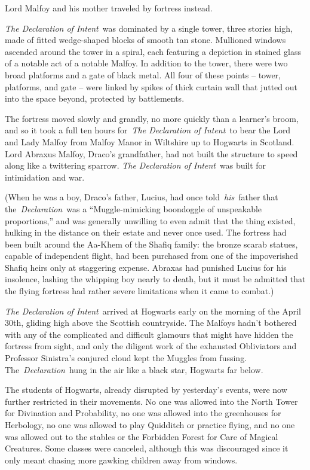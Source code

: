 Lord Malfoy and his mother traveled by fortress instead.

\emph{The Declaration of Intent}~was dominated by a single tower, three
stories high, made of fitted wedge-shaped blocks of smooth tan stone.
Mullioned windows ascended around the tower in a spiral, each featuring
a depiction in stained glass of a notable act of a notable Malfoy. In
addition to the tower, there were two broad platforms and a gate of
black metal. All four of these points -- tower, platforms, and gate --
were linked by spikes of thick curtain wall that jutted out into the
space beyond, protected by battlements.

The fortress moved slowly and grandly, no more quickly than a learner's
broom, and so it took a full ten hours for~\emph{The Declaration of
Intent}~to bear the Lord and Lady Malfoy from Malfoy Manor in Wiltshire
up to Hogwarts in Scotland. Lord Abraxus Malfoy, Draco's grandfather,
had not built the structure to speed along like a twittering sparrow.
\emph{The Declaration of Intent}~was built for intimidation and war.

(When he was a boy, Draco's father, Lucius, had once
told~\emph{his}~father that the~\emph{Declaration}~was a
``Muggle-mimicking boondoggle of unspeakable proportions,'' and was
generally unwilling to even admit that the thing existed, hulking in the
distance on their estate and never once used. The fortress had been
built around the Aa-Khem of the Shafiq family: the bronze scarab
statues, capable of independent flight, had been purchased from one of
the impoverished Shafiq heirs only at staggering expense. Abraxas had
punished Lucius for his insolence, lashing the whipping boy nearly to
death, but it must be admitted that the flying fortress had rather
severe limitations when it came to combat.)

\emph{The Declaration of Intent}~arrived at Hogwarts early on the
morning of the April 30th, gliding high above the Scottish countryside.
The Malfoys hadn't bothered with any of the complicated and difficult
glamours that might have hidden the fortress from sight, and only the
diligent work of the exhausted Obliviators and Professor Sinistra's
conjured cloud kept the Muggles from fussing.
The~\emph{Declaration}~hung in the air like a black star, Hogwarts far
below.

The students of Hogwarts, already disrupted by yesterday's events, were
now further restricted in their movements. No one was allowed into the
North Tower for Divination and Probability, no one was allowed into the
greenhouses for Herbology, no one was allowed to play Quidditch or
practice flying, and no one was allowed out to the stables or the
Forbidden Forest for Care of Magical Creatures. Some classes were
canceled, although this was discouraged since it only meant chasing more
gawking children away from windows.

